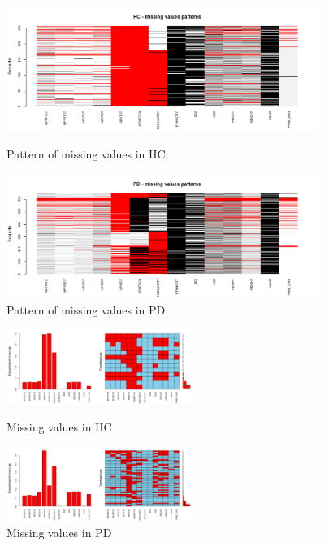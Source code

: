 \documentclass[]{article}
\begin{document}
\begin{figure}[h]

	\centering
	\includegraphics[width=4in]{../missing_patterns_HC}
	\caption{Pattern of missing values in HC}
	\label{fig:missing_patterns_HC}

	\centering
	\includegraphics[width=4in]{../missing_patterns_PD}
	\caption{Pattern of missing values in PD}
	\label{fig:missing_patterns_PD}
	
\end{figure} 
\begin{figure}[h]
	\centering
	\includegraphics[width=2.4in]{../missing_values_HC}
	\caption{Missing values in HC}
	\label{fig:HC_missing_values}
	
	\centering
	\includegraphics[width=2.4in]{../missing_values_PD}
	\caption{Missing values in PD}
	\label{fig:PD_missing_values}

\end{figure} 
\end{document}
